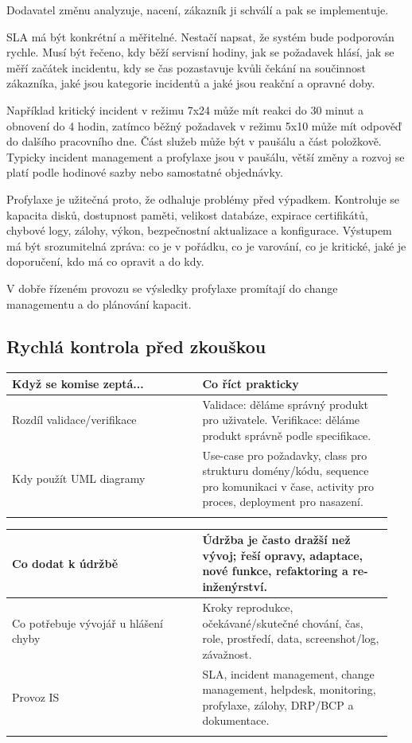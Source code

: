 \documentclass[11pt,a4paper]{article}
\begin{document}
Dodavatel změnu analyzuje, nacení, zákazník ji schválí a pak se implementuje.

SLA má být konkrétní a měřitelné. Nestačí napsat, že systém bude podporován rychle. Musí být řečeno, kdy běží servisní hodiny, jak se požadavek hlásí, jak se měří začátek incidentu, kdy se čas pozastavuje kvůli čekání na součinnost zákazníka, jaké jsou kategorie incidentů a jaké jsou reakční a opravné doby.

Například kritický incident v režimu 7x24 může mít reakci do 30 minut a obnovení do 4 hodin, zatímco běžný požadavek v režimu 5x10 může mít odpověď do dalšího pracovního dne. Část služeb může být v paušálu a část položkově. Typicky incident management a profylaxe jsou v paušálu, větší změny a rozvoj se platí podle hodinové sazby nebo samostatné objednávky.

Profylaxe je užitečná proto, že odhaluje problémy před výpadkem. Kontroluje se kapacita disků, dostupnost paměti, velikost databáze, expirace certifikátů, chybové logy, zálohy, výkon, bezpečnostní aktualizace a konfigurace. Výstupem má být srozumitelná zpráva: co je v pořádku, co je varování, co je kritické, jaké je doporučení, kdo má co opravit a do kdy.

V dobře řízeném provozu se výsledky profylaxe promítají do change managementu a do plánování kapacit.

\subsection*{Rychlá kontrola před zkouškou}

\begin{longtable}{p{0.475\linewidth}p{0.475\linewidth}}
\toprule
\textbf{Když se komise zeptá...} & \textbf{Co říct prakticky} \\
\midrule\endhead
Rozdíl validace/verifikace & Validace: děláme správný produkt pro uživatele. Verifikace: děláme produkt správně podle specifikace. \\
\addlinespace
Kdy použít UML diagramy & Use-case pro požadavky, class pro strukturu domény/kódu, sequence pro komunikaci v čase, activity pro proces, deployment pro nasazení. \\
\addlinespace
\bottomrule
\end{longtable}

\begin{longtable}{p{0.475\linewidth}p{0.475\linewidth}}
\toprule
\textbf{Co dodat k údržbě} & \textbf{Údržba je často dražší než vývoj; řeší opravy, adaptace, nové funkce, refaktoring a re-inženýrství.} \\
\midrule\endhead
Co potřebuje vývojář u hlášení chyby & Kroky reprodukce, očekávané/skutečné chování, čas, role, prostředí, data, screenshot/log, závažnost. \\
\addlinespace
Provoz IS & SLA, incident management, change management, helpdesk, monitoring, profylaxe, zálohy, DRP/BCP a dokumentace. \\
\addlinespace
\bottomrule
\end{longtable}
\end{document}
